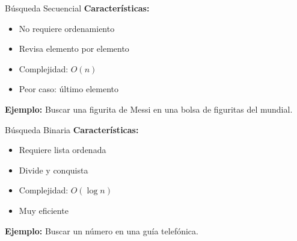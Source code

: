 \documentclass{beamer}
\begin{document}
\begin{frame}{Búsqueda Secuencial}
    \textbf{Características:}
    \begin{itemize}
        \item No requiere ordenamiento
        \item Revisa elemento por elemento
        \item Complejidad: $O(n)$
        \item Peor caso: último elemento
    \end{itemize}
    
    \vspace{0.5cm}
    
    \textbf{Ejemplo:}
    Buscar una figurita de Messi en una bolsa de figuritas del mundial.
\end{frame}

\begin{frame}{Búsqueda Binaria}
    \textbf{Características:}
    \begin{itemize}
        \item Requiere lista ordenada
        \item Divide y conquista
        \item Complejidad: $O(\log n)$
        \item Muy eficiente
    \end{itemize}
    
    \vspace{0.5cm}
    
    \textbf{Ejemplo:}
    Buscar un número en una guía telefónica.
\end{frame}
\end{document}
